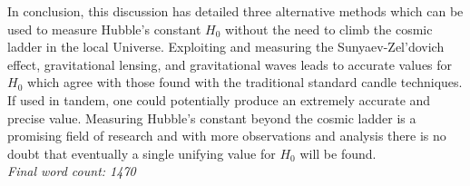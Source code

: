 \documentclass[12pt, onecolumn]{revtex4}    %
\begin{document}
In conclusion, this discussion has detailed three alternative methods which can be used to measure Hubble's constant $H_0$ without the need to climb the cosmic ladder in the local Universe. Exploiting and measuring the Sunyaev-Zel'dovich effect, gravitational lensing, and gravitational waves leads to accurate values for $H_0$ which agree with those found with the traditional standard candle techniques. If used in tandem, one could potentially produce an extremely accurate and precise value. Measuring Hubble's constant beyond the cosmic ladder is a promising field of research and with more observations and analysis there is no doubt that eventually a single unifying value for $H_0$ will be found. \\ 

\textit{Final word count: 1470}

\newpage





\newpage
\end{document}
